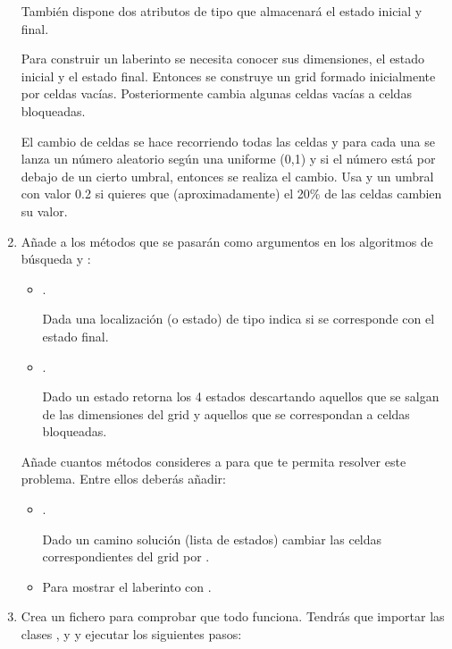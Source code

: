 \begin{enumerate}
También dispone dos atributos de tipo  que almacenará el estado inicial y final. 

Para construir un laberinto se necesita conocer sus dimensiones, el estado inicial y el estado final. Entonces se construye un grid formado inicialmente por celdas vacías. Posteriormente cambia algunas celdas vacías a celdas bloqueadas.

El cambio de celdas se hace recorriendo todas las celdas y para cada una se lanza un número aleatorio según una uniforme (0,1) y si el número está por debajo de un cierto umbral, entonces se realiza el cambio. Usa  y un umbral con valor 0.2 si quieres que (aproximadamente) el 20\% de las celdas cambien su valor.

\item Añade a  los métodos que se pasarán como argumentos en los algoritmos de búsqueda  y :
\begin{itemize}
\item {}.

	Dada una localización (o estado) de tipo  indica si se corresponde con el estado final.
	
\item {}.

	Dado un estado \hbox{}
	retorna los 4 estados  
	descartando aquellos que se salgan de las dimensiones del grid
	y aquellos que se correspondan a celdas bloqueadas.
\end{itemize}


Añade cuantos métodos consideres a  para que te permita resolver este problema. Entre ellos deberás añadir:
\begin{itemize}
\item {}.

Dado un camino solución (lista de estados) cambiar 
las celdas correspondientes del grid por .

\item {}

Para mostrar el laberinto con .
\end{itemize}


\item Crea un fichero para comprobar que todo funciona.
Tendrás que importar las clases ,  y  y ejecutar los siguientes pasos:


\end{enumerate}
